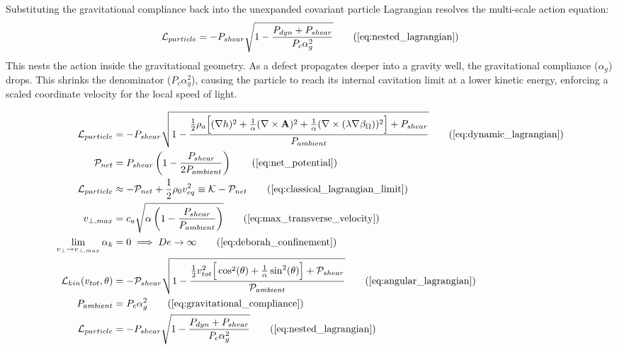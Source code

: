 Substituting the gravitational compliance back into the unexpanded covariant particle Lagrangian resolves the multi-scale action equation:
\begin{equation}
    \mathcal{L}_{particle} = - P_{shear} \sqrt{1 - \frac{P_{dyn} + P_{shear}}{P_c \alpha_g^2}} \tag{\ref{eq:nested_lagrangian}}
\end{equation}
This nests the action inside the gravitational geometry. As a defect propagates deeper into a gravity well, the gravitational compliance ($\alpha_g$) drops. This shrinks the denominator ($P_c \alpha_g^2$), causing the particle to reach its internal cavitation limit at a lower kinetic energy, enforcing a scaled coordinate velocity for the local speed of light. 

\begin{tcolorbox}[recallbox, title={\ref{box:unified_lagrangian}. The Unified Kinematic Lagrangian}]
\begin{align}
    \mathcal{L}_{particle} &= - P_{shear} \sqrt{1 - \frac{\frac{1}{2}\rho_a \Big[ (\nabla h)^2 + \frac{1}{\alpha}(\nabla \times \mathbf{A})^2 + \frac{1}{\alpha}(\nabla \times (\lambda \nabla \beta_\Omega))^2 \Big] + P_{shear}}{P_{ambient}}} \tag{\ref{eq:dynamic_lagrangian}} \\
    \mathcal{P}_{net} &= P_{shear} \left( 1 - \frac{P_{shear}}{2 P_{ambient}} \right) \tag{\ref{eq:net_potential}} \\
    \mathcal{L}_{particle} &\approx - \mathcal{P}_{net} + \frac{1}{2}\rho_0 v_{eq}^2 \equiv \mathcal{K} - \mathcal{P}_{net} \tag{\ref{eq:classical_lagrangian_limit}} \\
    v_{\perp, max} &= c_a \sqrt{\alpha \left( 1 - \frac{P_{shear}}{P_{ambient}} \right)} \tag{\ref{eq:max_transverse_velocity}} \\
    \lim_{v_\perp \to v_{\perp, max}} \alpha_k &= 0 \implies De \to \infty \tag{\ref{eq:deborah_confinement}} \\
    \mathcal{L}_{kin}(v_{tot}, \theta) &= - \mathcal{P}_{shear} \sqrt{1 - \frac{\frac{1}{2} v_{tot}^2 \Big[ \cos^2(\theta) + \frac{1}{\alpha}\sin^2(\theta) \Big] + \mathcal{P}_{shear}}{\mathcal{P}_{ambient}}} \tag{\ref{eq:angular_lagrangian}} \\
    P_{ambient} &= P_c \alpha_g^2 \tag{\ref{eq:gravitational_compliance}} \\
    \mathcal{L}_{particle} &= - P_{shear} \sqrt{1 - \frac{P_{dyn} + P_{shear}}{P_c \alpha_g^2}} \tag{\ref{eq:nested_lagrangian}}
\end{align}
\end{tcolorbox}



